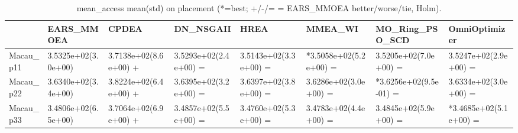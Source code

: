 \begin{table}[t]
\centering
\caption{mean_access mean(std) on placement (*=best; +/-/= = EARS_MMOEA better/worse/tie, Holm).}
\label{tab:placement_mean_access}
\begin{tabular}{llllllll}
\toprule
 & EARS\_MMOEA & CPDEA & DN\_NSGAII & HREA & MMEA\_WI & MO\_Ring\_PSO\_SCD & OmniOptimizer \\
\midrule
Macau\_p11 & 3.5325e+02(3.0e+00) & 3.7138e+02(8.6e+00) + & 3.5293e+02(2.4e+00) = & 3.5143e+02(3.3e+00) = & *3.5058e+02(5.2e+00) = & 3.5205e+02(7.0e+00) = & 3.5247e+02(2.9e+00) = \\
Macau\_p22 & 3.6340e+02(3.4e+00) & 3.8224e+02(6.4e+00) + & 3.6395e+02(3.2e+00) = & 3.6397e+02(3.8e+00) = & 3.6286e+02(3.0e+00) = & *3.6256e+02(9.5e-01) = & 3.6334e+02(3.0e+00) = \\
Macau\_p33 & 3.4806e+02(6.5e+00) & 3.7064e+02(6.9e+00) + & 3.4857e+02(5.5e+00) = & 3.4760e+02(5.3e+00) = & 3.4783e+02(4.4e+00) = & 3.4845e+02(5.9e+00) = & *3.4685e+02(5.1e+00) = \\
\bottomrule
\end{tabular}
\end{table}
